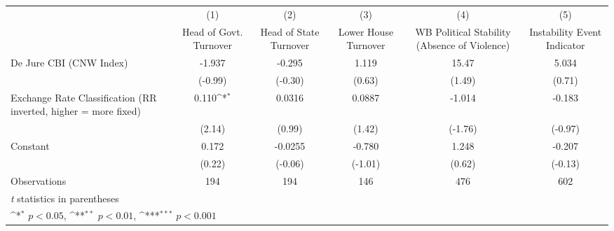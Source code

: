 {
\def\sym#1{\ifmmode^{#1}\else\(^{#1}\)\fi}
\begin{tabular}{l*{5}{c}}
\hline\hline
                &\multicolumn{1}{c}{(1)}&\multicolumn{1}{c}{(2)}&\multicolumn{1}{c}{(3)}&\multicolumn{1}{c}{(4)}&\multicolumn{1}{c}{(5)}\\
                &\multicolumn{1}{c}{Head of Govt. Turnover}&\multicolumn{1}{c}{Head of State Turnover}&\multicolumn{1}{c}{Lower House Turnover}&\multicolumn{1}{c}{WB Political Stability (Absence of Violence)}&\multicolumn{1}{c}{Instability Event Indicator}\\
\hline
De Jure CBI (CNW Index)&   -1.937         &   -0.295         &    1.119         &    15.47         &    5.034         \\
                &  (-0.99)         &  (-0.30)         &   (0.63)         &   (1.49)         &   (0.71)         \\
[1em]
Exchange Rate Classification (RR inverted, higher = more fixed)&    0.110\sym{*}  &   0.0316         &   0.0887         &   -1.014         &   -0.183         \\
                &   (2.14)         &   (0.99)         &   (1.42)         &  (-1.76)         &  (-0.97)         \\
[1em]
Constant        &    0.172         &  -0.0255         &   -0.780         &    1.248         &   -0.207         \\
                &   (0.22)         &  (-0.06)         &  (-1.01)         &   (0.62)         &  (-0.13)         \\
\hline
Observations    &      194         &      194         &      146         &      476         &      602         \\
\hline\hline
\multicolumn{6}{l}{\footnotesize \textit{t} statistics in parentheses}\\
\multicolumn{6}{l}{\footnotesize \sym{*} \(p<0.05\), \sym{**} \(p<0.01\), \sym{***} \(p<0.001\)}\\
\end{tabular}
}
